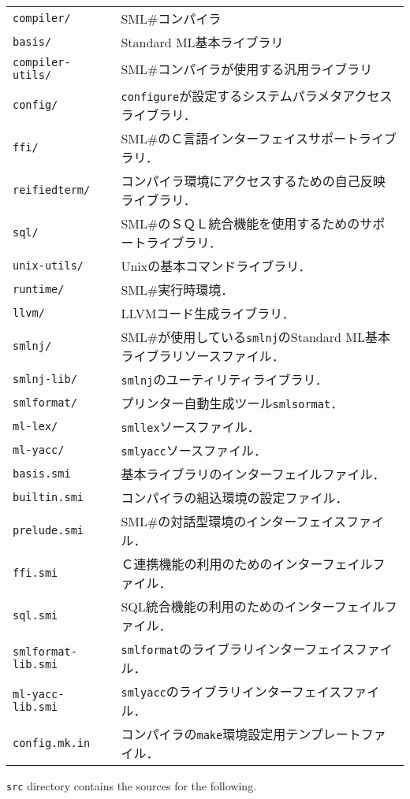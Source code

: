 \documentclass{jbook}
\newcommand{\smlsharp}{SML\#}
\newcommand{\code}[1]{\mbox{\large\tt #1}}
\begin{document}
\begin{tabular}{ll}
\code{compiler/} & \smlsharp{}コンパイラ
\\
\code{basis/} & Standard ML基本ライブラリ
\\
\code{compiler-utils/} & \smlsharp{}コンパイラが使用する汎用ライブラリ
\\
\code{config/} & \code{configure}が設定するシステムパラメタアクセスライブラリ．
\\
\code{ffi/} & \smlsharp{}のＣ言語インターフェイスサポートライブラリ．
\\
\code{reifiedterm/} & コンパイラ環境にアクセスするための自己反映ライブラリ．
\\
\code{sql/} & \smlsharp{}のＳＱＬ統合機能を使用するためのサポートライブラリ．
\\
\code{unix-utils/}& Unixの基本コマンドライブラリ．
\\
\code{runtime/} & \smlsharp{}実行時環境．
\\
\code{llvm/} & LLVMコード生成ライブラリ．
\\
\code{smlnj/} & \smlsharp{}が使用している\code{smlnj}のStandard ML基本ライブラリソースファイル．
\\
\code{smlnj-lib/} & \code{smlnj}のユーティリティライブラリ．
\\
\code{smlformat/} & プリンター自動生成ツール\code{smlsormat}．
\\
\code{ml-lex/} & \code{smllex}ソースファイル．
\\
\code{ml-yacc/} & \code{smlyacc}ソースファイル．
\\
\code{basis.smi} & 基本ライブラリのインターフェイルファイル．
\\
\code{builtin.smi} & コンパイラの組込環境の設定ファイル．
\\
\code{prelude.smi} & \smlsharp{}の対話型環境のインターフェイスファイル．
\\
\code{ffi.smi} & Ｃ連携機能の利用のためのインターフェイルファイル．
\\
\code{sql.smi} & SQL統合機能の利用のためのインターフェイルファイル．
\\
\code{smlformat-lib.smi} & \code{smlformat}のライブラリインターフェイスファイル．
\\
\code{ml-yacc-lib.smi} & \code{smlyacc}のライブラリインターフェイスファイル．
\\
\code{config.mk.in} & コンパイラの\code{make}環境設定用テンプレートファイル．
\end{tabular}

\else%
	\code{src} directory contains the sources for the following.
\end{document}
